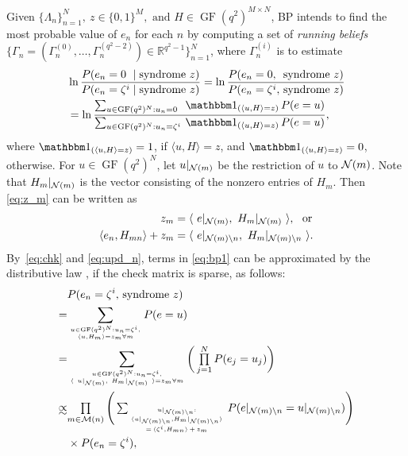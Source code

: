 \documentclass{ieeeaccess}
\DeclareMathOperator{\GF}{GF}
\newcommand{\sM}{{\cal M}}
\newcommand{\sN}{{\cal N}}
\newcommand{\RR}{{\mathbb R}}
\let\emph\textit
\theoremstyle{definition}		%
\def\approxprop{%
	\def\p{%
		\setbox0=\vbox{\hbox{$\propto$}}%
		\ht0=0.7ex \box0 }%
	\def\s{%
		\vbox{\hbox{$\sim$}}%
	}%
	\mathrel{\raisebox{0.4ex}{%
			\mbox{$\underset{\s}{\p}$}%
	}}%
}
\begin{document}
Given ${\{\Lambda_n\}_{n=1}^N,\ {z\in\{0,1\}^M}, \text{ and } H\in\GF(q^2)^{M\times N} }$,
BP intends to find the most probable value of  $e_n$ for each $n$ by computing 
a set of \emph{running beliefs} $ \{\Gamma_n = (\Gamma_n^{(0)}, \dots, \Gamma_n^{(q^2-2)})\in\RR^{q^2-1}\}_{n=1}^N $, 
where $\Gamma_n^{(i)}$ is to estimate
\begin{align}
 &\ln\frac{ P(e_n=0\,\,\mid  \text{syndrome } z) }{ P(e_n=\zeta^i\mid  \text{syndrome } z  )}\notag 
 =\ln \frac{ P(e_n=0,\,\,\, \text{syndrome }z) }{ P(e_n=\zeta^i,\, \text{syndrome } z )} \notag \\ 
 &=\ln \frac{ \sum_{u\in\GF(q^2)^N: u_n = 0}      ~\, \mathbbm 1_{(\langle u,H \rangle=z)} \, P(e=u) }
			{ \sum_{u\in\GF(q^2)^N: u_n = \zeta^i} \, \mathbbm 1_{(\langle u,H \rangle=z)} \, P(e=u) }, \label{eq:bp1} 
\end{align}
where $\mathbbm 1_{(\langle u,H \rangle=z)} = 1$, if $\langle u,H \rangle = z$, and \mbox{$\mathbbm 1_{(\langle u,H \rangle=z)} = 0$}, otherwise.
For $u\in\GF(q^2)^N$, let $u|_{\sN(m)}$ be the restriction of $u$ to $\sN(m)$. 
%
Note that $H_m|_{\sN(m)}$ is the vector consisting of the nonzero entries of $H_m$.
%
Then \eqref{eq:z_m} can be written as
\begin{align} 
z_m &= \langle ~ e|_{\sN(m)},~ H_m|_{\sN(m)} ~ \rangle, ~~ \text{or} \label{eq:chk} \\
\langle e_n, H_{mn} \rangle + z_m &= \langle ~ e|_{\sN(m)\setminus n},~ H_m|_{\sN(m)\setminus n} ~ \rangle \label{eq:upd_n}.
\end{align}
By~\eqref{eq:chk} and \eqref{eq:upd_n}, terms in \eqref{eq:bp1} can be approximated by the distributive law \cite{AM00}, 
if the check matrix is sparse, as follows: 
\small
\begin{align}
& P(e_n=\zeta^i,\, \text{syndrome } z) \notag\\ 
=& \sum_{u\in\GF(q^2)^N: u_n=\zeta^i, \atop \langle u, H_m \rangle = z_m \forall m} P(e=u) \notag \\
=& \sum_{u\in\GF(q^2)^N: u_n=\zeta^i, \atop \langle ~ u|_{\sN(m)},~ H_m|_{\sN(m)} ~ \rangle = z_m \forall m} \bigg( \textstyle \prod\limits_{j=1}^N P(e_{j}=u_{j}) \bigg) \notag \\
\approxprop & { \textstyle \prod\limits_{m\in\sM(n)} \Bigg( \sum_{u|_{\sN(m)\setminus n}: \atop { \langle u|_{\sN(m)\setminus n}, H_m|_{\sN(m)\setminus n} \rangle \atop =\, \langle \zeta^i, H_{mn} \rangle \,+\, z_m } } P(e|_{\sN(m)\setminus n}=u|_{\sN(m)\setminus n}) \Bigg) } \notag\\\
&\times P(e_n=\zeta^i), \label{eq:sum_all}
\end{align}
\end{document}
